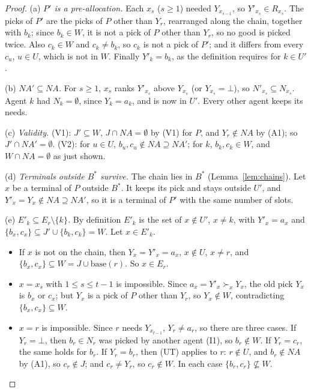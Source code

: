 \documentclass[runningheads,11pt]{llncs}
\newcommand{\NA}{\mathit{NA}}
\newcommand{\base}{\mathrm{base}}
\newcommand{\none}{\bot}
\begin{document}
\begin{proof}
(a) \emph{$P'$ is a pre-allocation.} Each $x_s$ ($s\ge1$) needed $Y_{x_{s-1}}$, so $Y'_{x_s}\in R_{x_s}$. The picks of $P'$ are the picks of $P$ other than $Y_r$, rearranged along the chain, together with $b_k$; since $b_k\in W$, it is not a pick of $P$ other than $Y_r$, so no good is picked twice. Also $c_k\in W$ and $c_k\ne b_k$, so $c_k$ is not a pick of $P'$; and it differs from every $c_u$, $u\in U$, which is not in $W$. Finally $Y'_k=b_k$, as the definition requires for $k\in U'$.

(b) \emph{$\NA'\subseteq\NA$.} For $s\ge1$, $x_s$ ranks $Y'_{x_s}$ above $Y_{x_s}$ (or $Y_{x_s}=\none$), so $N'_{x_s}\subseteq N_{x_s}$. Agent $k$ had $N_k=\emptyset$, since $Y_k=a_k$, and is now in $U'$. Every other agent keeps its needs.

(c) \emph{Validity.} (V1): $J'\subseteq W$, $J\cap\NA=\emptyset$ by (V1) for $P$, and $Y_r\notin\NA$ by (A1); so $J'\cap\NA'=\emptyset$. (V2): for $u\in U$, $b_u,c_u\notin\NA\supseteq\NA'$; for $k$, $b_k,c_k\in W$, and $W\cap\NA=\emptyset$ as just shown.

(d) \emph{Terminals outside $B^*$ survive.} The chain lies in $B^*$ (Lemma~\ref{lem:chains}). Let $x$ be a terminal of $P$ outside $B^*$. It keeps its pick and stays outside $U'$, and $Y'_x=Y_x\notin\NA\supseteq\NA'$, so it is a terminal of $P'$ with the same number of slots.

(e) \emph{$E'_k\subseteq E_r\setminus\{k\}$.} By definition $E'_k$ is the set of $x\notin U'$, $x\ne k$, with $Y'_x=a_x$ and $\{b_x,c_x\}\subseteq J'\cup\{b_k,c_k\}=W$. Let $x\in E'_k$.
\begin{itemize}
\item If $x$ is not on the chain, then $Y_x=Y'_x=a_x$, $x\notin U$, $x\ne r$, and $\{b_x,c_x\}\subseteq W=J\cup\base(r)$. So $x\in E_r$.
\item $x=x_s$ with $1\le s\le t-1$ is impossible. Since $a_x=Y'_x\succ_x Y_x$, the old pick $Y_x$ is $b_x$ or $c_x$; but $Y_x$ is a pick of $P$ other than $Y_r$, so $Y_x\notin W$, contradicting $\{b_x,c_x\}\subseteq W$.
\item $x=r$ is impossible. Since $r$ needs $Y_{x_{t-1}}$, $Y_r\ne a_r$, so there are three cases. If $Y_r=\none$, then $b_r\in N_r$ was picked by another agent (I1), so $b_r\notin W$. If $Y_r=c_r$, the same holds for $b_r$. If $Y_r=b_r$, then (UT) applies to $r$: $r\notin U$, and $b_r\notin\NA$ by (A1), so $c_r\notin J$; and $c_r\ne Y_r$, so $c_r\notin W$. In each case $\{b_r,c_r\}\not\subseteq W$.
\end{itemize}


\end{proof}
\end{document}

